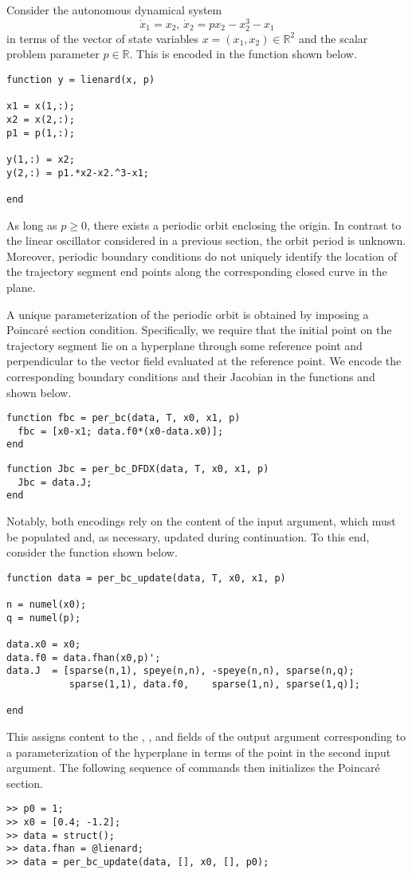 Consider the autonomous dynamical system
\begin{equation}
\dot{x}_1=x_2,\,\dot{x}_2=px_2-x_2^3-x_1
\end{equation}
in terms of the vector of state variables $x=(x_1,x_2)\in\mathbb{R}^2$ and the scalar problem parameter $p\in\mathbb{R}$. This is encoded in the function  shown below.
\begin{lstlisting}[language=coco-highlight]
function y = lienard(x, p)

x1 = x(1,:);
x2 = x(2,:);
p1 = p(1,:);

y(1,:) = x2;
y(2,:) = p1.*x2-x2.^3-x1;

end
\end{lstlisting}
As long as $p\ge 0$, there exists a periodic orbit enclosing the origin. In contrast to the linear oscillator considered in a previous section, the orbit period is unknown. Moreover, periodic boundary conditions do not uniquely identify the location of the trajectory segment end points along the corresponding closed curve in the plane. 

A unique parameterization of the periodic orbit is obtained by imposing a Poincar\'{e} section condition. Specifically, we require that the initial point on the trajectory segment lie on a hyperplane through some reference point and perpendicular to the vector field evaluated at the reference point. We encode the corresponding boundary conditions and their Jacobian in the functions  and  shown below.
\begin{lstlisting}[language=coco-highlight]
function fbc = per_bc(data, T, x0, x1, p)
  fbc = [x0-x1; data.f0*(x0-data.x0)];
end
\end{lstlisting}
\begin{lstlisting}[language=coco-highlight]
function Jbc = per_bc_DFDX(data, T, x0, x1, p)
  Jbc = data.J;
end
\end{lstlisting}
Notably, both encodings rely on the content of the  input argument, which must be populated and, as necessary, updated during continuation. To this end, consider the function  shown below.
\begin{lstlisting}[language=coco-highlight]
function data = per_bc_update(data, T, x0, x1, p)

n = numel(x0);
q = numel(p);

data.x0 = x0;
data.f0 = data.fhan(x0,p)';
data.J  = [sparse(n,1), speye(n,n), -speye(n,n), sparse(n,q);
           sparse(1,1), data.f0,    sparse(1,n), sparse(1,q)];

end
\end{lstlisting}
This assigns content to the , , and  fields of the  output argument corresponding to a parameterization of the hyperplane in terms of the point  in the second input argument. The following sequence of commands then initializes the Poincar\'{e} section.
\begin{lstlisting}[language=coco-highlight]
>> p0 = 1;
>> x0 = [0.4; -1.2];
>> data = struct();
>> data.fhan = @lienard;
>> data = per_bc_update(data, [], x0, [], p0);
\end{lstlisting}

